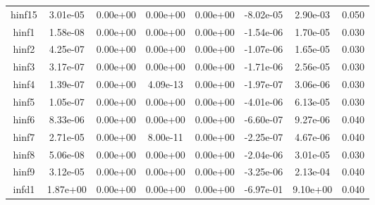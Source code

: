 {{\begin{table}[h]
\begin{center}
{\begin{tabular}{cccccccc}
              hinf15 & 3.01e-05 & 0.00e+00 & 0.00e+00 & 0.00e+00 & -8.02e-05 & 2.90e-03 & 0.050 \\ 
               hinf1 & 1.58e-08 & 0.00e+00 & 0.00e+00 & 0.00e+00 & -1.54e-06 & 1.70e-05 & 0.030 \\ 
               hinf2 & 4.25e-07 & 0.00e+00 & 0.00e+00 & 0.00e+00 & -1.07e-06 & 1.65e-05 & 0.030 \\ 
               hinf3 & 3.17e-07 & 0.00e+00 & 0.00e+00 & 0.00e+00 & -1.71e-06 & 2.56e-05 & 0.030 \\ 
               hinf4 & 1.39e-07 & 0.00e+00 & 4.09e-13 & 0.00e+00 & -1.97e-07 & 3.06e-06 & 0.030 \\ 
               hinf5 & 1.05e-07 & 0.00e+00 & 0.00e+00 & 0.00e+00 & -4.01e-06 & 6.13e-05 & 0.030 \\ 
               hinf6 & 8.33e-06 & 0.00e+00 & 0.00e+00 & 0.00e+00 & -6.60e-07 & 9.27e-06 & 0.040 \\ 
               hinf7 & 2.71e-05 & 0.00e+00 & 8.00e-11 & 0.00e+00 & -2.25e-07 & 4.67e-06 & 0.040 \\ 
               hinf8 & 5.06e-08 & 0.00e+00 & 0.00e+00 & 0.00e+00 & -2.04e-06 & 3.01e-05 & 0.030 \\ 
               hinf9 & 3.12e-05 & 0.00e+00 & 0.00e+00 & 0.00e+00 & -3.25e-06 & 2.13e-04 & 0.040 \\ 
               infd1 & 1.87e+00 & 0.00e+00 & 0.00e+00 & 0.00e+00 & -6.97e-01 & 9.10e+00 & 0.040 \\ 
      \bottomrule
    \end{tabular}
  }  
\end{center}
\end{table}}}

